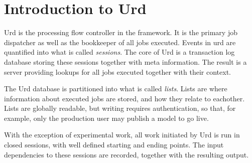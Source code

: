 
\label{chap:urd}

\section{Introduction to Urd}

Urd is the processing flow controller in the framework.  It is the
primary job dispatcher as well as the bookkeeper of all jobs executed.
Events in urd are quantified into what is called \textsl{sessions}.
The core of Urd is a transaction log database storing these sessions
together with meta information.  The result is a server providing
lookups for all jobs executed together with their context.

The Urd database is partitioned into what is called \textsl{lists}.
Lists are where information about executed jobs are stored, and how
they relate to eachother.  Lists are globally readable, but writing
requires authentication, so that, for example, only the production
user may publish a model to go live.

With the exception of experimental work, all work initiated by Urd is
run in closed sessions, with well defined starting and ending points.
The input dependencies to these sessions are recorded, together with
the resulting output.



